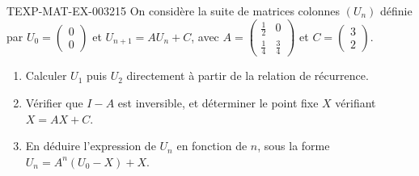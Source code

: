 \begin{exercice}{TEXP-MAT-EX-003}{2}{15}
On considère la suite de matrices colonnes $(U_n)$ définie par $U_0=\begin{pmatrix}0\\0\end{pmatrix}$ et $U_{n+1}=AU_n+C$, avec $A=\begin{pmatrix}\tfrac{1}{2}&0\\\tfrac{1}{4}&\tfrac{3}{4}\end{pmatrix}$ et $C=\begin{pmatrix}3\\2\end{pmatrix}$.
\begin{enumerate}
  \item Calculer $U_1$ puis $U_2$ directement à partir de la relation de récurrence.
  \item Vérifier que $I-A$ est inversible, et déterminer le point fixe $X$ vérifiant $X=AX+C$.
  \item En déduire l'expression de $U_n$ en fonction de $n$, sous la forme $U_n=A^n(U_0-X)+X$.
\end{enumerate}
\end{exercice}
